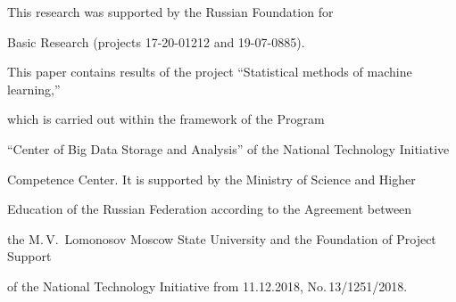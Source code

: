 


\Ack

\noindent

This research was supported by the Russian Foundation for

Basic Research (projects 17-20-01212 and 19-07-0885). 

This paper contains results of the project ``Statistical methods of machine learning,'' 

which is carried out within the framework of the Program 

``Center of Big Data Storage and Analysis'' of the National Technology Initiative 

Competence Center. It is supported by the Ministry of Science and Higher

 Education of the Russian Federation according to the Agreement between 

 the M.\,V.~Lomonosov Moscow State University and the Foundation of Project Support 

of the National Technology Initiative from 11.12.2018, No.\,13/1251/2018.





\renewcommand{\bibname}{\protect\rmfamily References}




